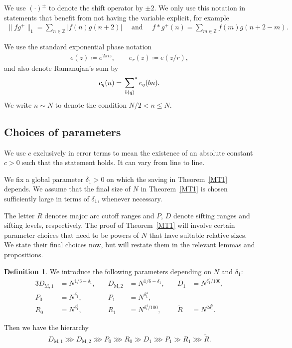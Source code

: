 \documentclass[12pt]{amsart}
\theoremstyle{definition}
\newtheorem{definition}[theorem]{Definition}
\theoremstyle{remark}
\numberwithin{equation}{section}
\newcommand{\asum}{\sideset{}{^{\ast}}\sum}
\newcommand{\1}{\mathbf{1}}
\begin{document}
We use $(\cdot)^\pm$ to denote the shift operator by $\pm 2$. We only use this notation in statements that benefit from not having the variable explicit, for example
\begin{align*}
    \| fg^+\|_1=\sum_{n\in \mathbb{Z}} |f(n)g(n+2)| \quad  \text{ and } \quad f*g^+(n)=\sum_{m\in \mathbb{Z}}f(m)g(n+2-m).
\end{align*}


We use the standard exponential phase notation 
\begin{align*}
    e(z)\coloneqq e^{2\pi i z},\quad \quad
    e_r(z)\coloneqq e(z/r),
\end{align*}
and also denote Ramanujan's sum by
\[c_q(n)=\asum_{b(q)}e_q(bn).\]
We write $n\sim N$ to denote the condition $N/2<n\leq N$.

\subsection{Choices of parameters}
We use $c$ exclusively in error terms to mean the existence of an absolute constant $c>0$ such that the statement holds. It can vary from line to line.

We fix a global parameter $\delta_1>0$ on which the saving in Theorem~\ref{MT1} depends. We assume that the final size of $N$ in Theorem~\ref{MT1} is chosen sufficiently large in terms of $\delta_1$, whenever necessary. 

The letter $R$ denotes major arc cutoff ranges and $P$, $D$ denote sifting ranges and sifting levels, respectively. The proof of Theorem~\ref{MT1} will involve certain parameter choices that need to be powers of $N$ that have suitable relative sizes. We state their final choices now, but will restate them in the relevant lemmas and propositions. 

\begin{definition}\label{def:para}
We introduce the following parameters depending on $N$ and $\delta_1$:
\begin{alignat*}{3}
D_{\mathrm{M},1}&=N^{1/3-\delta_1}, \quad &D_{\mathrm{M},2}&=N^{1/6-\delta_1},\quad   &D_1&=N^{\delta_1^3/100}, \\
    P_0&=N^{\delta_1}, \quad &P_1&=N^{\delta_1^4},\\
    R_0&=N^{\delta_1^3},\quad  &R_1&=N^{\delta_1^4/100},\quad   &\widetilde{R}&=N^{2\delta_1^5}.
\end{alignat*}


Then we have the hierarchy
\begin{align*}
D_{\mathrm{M},1}\ggg D_{\mathrm{M},2}\ggg P_0\ggg R_0\gg D_1\ggg P_1\gg R_1\ggg \widetilde{R}.     
\end{align*}

\end{definition}
\end{document}
